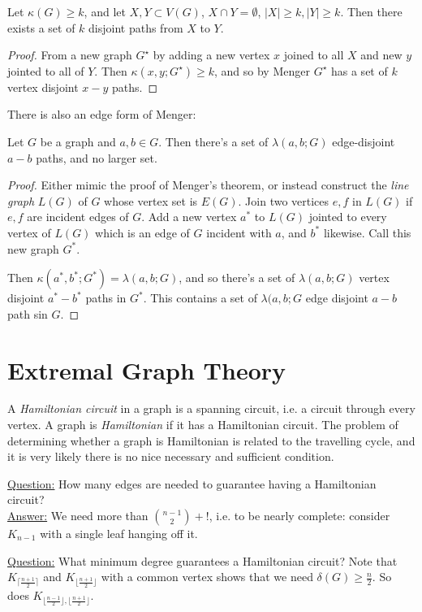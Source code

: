 \documentclass[10pt,a4paper]{article}
\begin{document}
\begin{corollary}
Let $\kappa(G)\geq k$, and let $X,Y \subset V(G)$, $X\cap Y = \emptyset$, $|X|\geq k, |Y|\geq k$. Then there exists a set of $k$ disjoint paths from $X$ to $Y$.
\end{corollary} 
\begin{proof}
From a new graph $G^\star$ by adding a new vertex $x$ joined to all $X$ and new $y$ jointed to all of $Y$. Then $\kappa(x,y;G^\star) \geq k$, and so by Menger $G^\star$ has a set of $k$ vertex disjoint $x-y$ paths.
\end{proof}
There is also an edge form of Menger:
\begin{theorem}
Let $G$ be a graph and $a,b \in G$. Then there's a set of $\lambda(a,b;G)$ edge-disjoint $a-b$ paths, and no larger set.
\end{theorem}
\begin{proof}
Either mimic the proof of Menger's theorem, or instead construct the \emph{line graph} $L(G)$ of $G$ whose vertex set is $E(G)$. Join two vertices $e,f$ in $L(G)$ if $e,f$ are incident edges of $G$. Add a new vertex $a^\ast$ to $L(G)$ jointed to every vertex of $L(G)$ which is an edge of $G$ incident with $a$, and $b^\ast$ likewise. Call this new graph $G^\ast$.

Then $\kappa(a^\ast, b^\ast; G^\ast) = \lambda(a,b;G)$, and so there's a set of $\lambda(a,b;G)$ vertex disjoint $a^\ast-b^\ast$ paths in $G^\ast$. This contains a set of $\lambda(a,b;G$ edge disjoint $a-b$ path sin $G$.
\end{proof}

\section{Extremal Graph Theory}
A \emph{Hamiltonian circuit} in a graph is a spanning circuit, i.e. a circuit through every vertex. A graph is \emph{Hamiltonian} if it has a Hamiltonian circuit. The problem of determining whether a graph is Hamiltonian is related to the travelling cycle, and it is very likely there is no nice necessary and sufficient condition.

\underline{Question:} How many edges are needed to guarantee having a Hamiltonian circuit?\\
\underline{Answer:} We need more than $\binom{n-1}{2}+!$, i.e. to be nearly complete: consider $K_{n-1}$ with a single leaf hanging off it.

\underline{Question:} What minimum degree guarantees a Hamiltonian circuit?
Note that $K_{\lceil\frac{n+1}{2}\rceil}$ and $K_{\lfloor\frac{n+1}{2}\rfloor}$ with a common vertex shows that we need $\delta(G)\geq \frac{n}{2}$. So does $K_{\lfloor\frac{n-1}{2}\rfloor,\lfloor\frac{n+1}{2}\rfloor}$.
\end{document}
